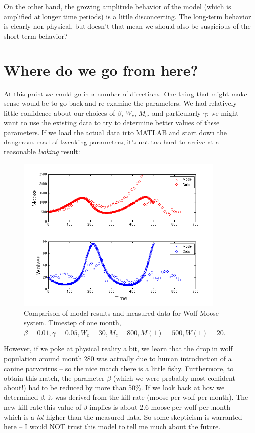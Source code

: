 On the other hand, the growing amplitude behavior of the model (which is amplified at longer time periods) is a little disconcerting.   The long-term behavior is clearly non-physical, but doesn't that mean we should also be suspicious of the short-term behavior?

\section{Where do we go from here?}

At this point we could go in a number of directions.  One thing that might make sense would be to go back and re-examine the parameters.  We had relatively little confidence about our choices of $\beta$, $W_c$, $M_c$,  and particularly $\gamma$; we might want to use the existing data to try to determine better values of these parameters.  If we load the actual data into MATLAB and start down the dangerous road of tweaking parameters, it's not too hard to arrive at a reasonable {\it looking} result:

\begin{figure}[h!]
\includegraphics[width=4in]{figs/ModelDataComparison}
\caption{Comparison of model results and measured data  for Wolf-Moose system. Timestep of one month,  $\beta = 0.01, \gamma = 0.05, W_c = 30, M_c=800, M(1) = 500, W(1) = 20$.}
\end{figure}

However, if we poke at physical reality a bit, we learn that the drop in wolf population around month 280 was actually due to human introduction of a canine parvovirus -- so the nice match there is a little fishy.  Furthermore, to obtain this match, the parameter $\beta$ (which we were probably most confident about!) had to be reduced by more than 50\%.  If we look back at how we determined $\beta$, it was derived from the kill rate (moose per wolf per month).  The new kill rate this value of $\beta$ implies is about $2.6$ moose per wolf per month -- which is a {\it lot} higher than the measured data.  So some skepticism is warranted here -- I would NOT trust this model to tell me much about the future.

